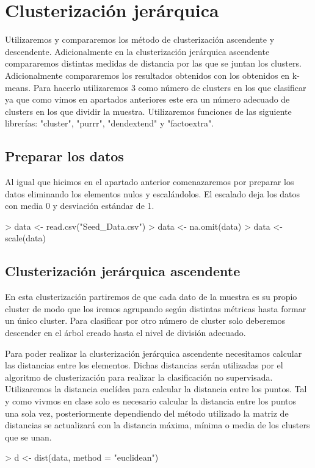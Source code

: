 \documentclass [a4paper] {article}
\begin{document}
\newpage
\section{Clusterización jerárquica}
Utilizaremos y compararemos los método de clusterización ascendente y descendente.
Adicionalmente en la clusterización jerárquica ascendente compararemos distintas medidas de distancia por las que se juntan los clusters.
Adicionalmente compararemos los resultados obtenidos con los obtenidos en k-means.
Para hacerlo utilizaremos 3 como número de clusters en los que clasificar ya que como vimos en apartados anteriores este era un número adecuado de clusters en los que dividir la muestra.
Utilizaremos funciones de las siguiente librerías: "cluster", "purrr", "dendextend" y "factoextra".

\subsection{Preparar los datos}
Al igual que hicimos en el apartado anterior comenazaremos por preparar los datos eliminando los elementos nulos y escalándolos.
El escalado deja los datos con media 0 y desviación estándar de 1.
\begin{Schunk}
\begin{Sinput}
> data <- read.csv("Seed_Data.csv")
> data <- na.omit(data)
> data <- scale(data)
\end{Sinput}
\end{Schunk}

\subsection{Clusterización jerárquica ascendente}
En esta clusterización partiremos de que cada dato de la muestra es su propio cluster de modo que los iremos agrupando según distintas métricas hasta formar un único cluster.
Para clasificar por otro número de cluster solo deberemos descender en el árbol creado hasta el nivel de división adecuado.

Para poder realizar la clusterización jerárquica ascendente necesitamos calcular las distancias entre los elementos.
Dichas distancias serán utilizadas por el algoritmo de clusterización para realizar la clasificación no supervisada.
Utilizaremos la distancia euclídea para calcular la distancia entre los puntos.
Tal y como vivmos en clase solo es necesario calcular la distancia entre los puntos una sola vez,
posteriormente dependiendo del método utilizado la matriz de distancias se actualizará con la distancia máxima, mínima o media de los clusters que se unan.
\begin{Schunk}
\begin{Sinput}
> d <- dist(data, method = "euclidean")
\end{Sinput}
\end{Schunk}
\end{document}
